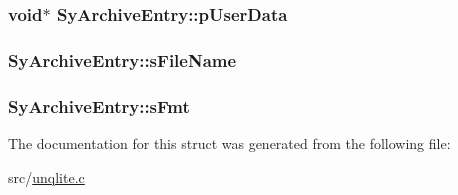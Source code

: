 \hypertarget{struct_sy_archive_entry_a57ec479d191f92556c83804fa6b59214}{
\subsubsection[{p\-User\-Data}]{\setlength{\rightskip}{0pt plus 5cm}void$\ast$ Sy\-Archive\-Entry\-::p\-User\-Data}}\label{d1/d8c/struct_sy_archive_entry_a57ec479d191f92556c83804fa6b59214}
\hypertarget{struct_sy_archive_entry_ac6d6029d48e52b3b3db8babf941f48ae}{
\subsubsection[{s\-File\-Name}]{ Sy\-Archive\-Entry\-::s\-File\-Name}}\label{d1/d8c/struct_sy_archive_entry_ac6d6029d48e52b3b3db8babf941f48ae}
\hypertarget{struct_sy_archive_entry_ab9b9770bbbb223a0d4836d5aba4a318c}{
\subsubsection[{s\-Fmt}]{ Sy\-Archive\-Entry\-::s\-Fmt}}\label{d1/d8c/struct_sy_archive_entry_ab9b9770bbbb223a0d4836d5aba4a318c}


The documentation for this struct was generated from the following file\-:\begin{DoxyCompactItemize}
\item 
src/\hyperlink{unqlite_8c}{unqlite.\-c}\end{DoxyCompactItemize}
